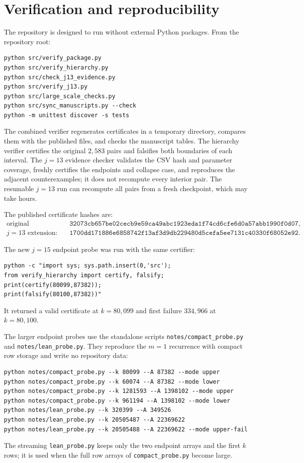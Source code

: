 \documentclass[11pt]{article}
\theoremstyle{remark}
\begin{document}
\section{Verification and reproducibility}\label{sec:verify}

The repository is designed to run without external Python packages. From the repository root:
\begin{verbatim}
python src/verify_package.py
python src/verify_hierarchy.py
python src/check_j13_evidence.py
python src/verify_j13.py
python src/large_scale_checks.py
python src/sync_manuscripts.py --check
python -m unittest discover -s tests
\end{verbatim}

The combined verifier regenerates certificates in a temporary directory, compares them with the published files, and checks the manuscript tables. The hierarchy verifier certifies the original \(2{,}583\) pairs and falsifies both boundaries of each interval. The \(j=13\) evidence checker validates the CSV hash and parameter coverage, freshly certifies the endpoints and collapse case, and reproduces the adjacent counterexamples; it does not recompute every interior pair. The resumable \(j=13\) run can recompute all pairs from a fresh checkpoint, which may take hours.

The published certificate hashes are:
\begin{align*}
\text{original hierarchy:}&\quad
\texttt{32073cb657be02cecb9e59ca49abc1923eda1f74cd6cfe6d0a57abb1990f0d07},\\
j=13\text{ extension:}&\quad
\texttt{1700dd171886e6858742f13af3d9db229480d5cefa5ee7131c40330f68052e92}.
\end{align*}

The new \(j=15\) endpoint probe was run with the same certifier:
\begin{verbatim}
python -c "import sys; sys.path.insert(0,'src');
from verify_hierarchy import certify, falsify;
print(certify(80099,87382));
print(falsify(80100,87382))"
\end{verbatim}
It returned a valid certificate at \(k=80{,}099\) and first failure \(334{,}966\) at \(k=80{,}100\).

The larger endpoint probes use the standalone scripts \texttt{notes/compact\_probe.py} and \texttt{notes/lean\_probe.py}. They reproduce the \(m=1\) recurrence with compact row storage and write no repository data:
\begin{verbatim}
python notes/compact_probe.py --k 80099 --A 87382 --mode upper
python notes/compact_probe.py --k 60074 --A 87382 --mode lower
python notes/compact_probe.py --k 1281593 --A 1398102 --mode upper
python notes/compact_probe.py --k 961194 --A 1398102 --mode lower
python notes/lean_probe.py --k 320399 --A 349526
python notes/lean_probe.py --k 20505487 --A 22369622
python notes/lean_probe.py --k 20505488 --A 22369622 --mode upper-fail
\end{verbatim}
The streaming \texttt{lean\_probe.py} keeps only the two endpoint arrays and the first \(k\) rows; it is used when the full row arrays of \texttt{compact\_probe.py} become large.
\end{document}
